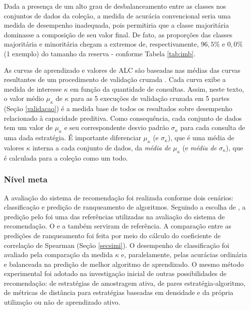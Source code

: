 Dada a presença de um alto grau de desbalanceamento entre as classes nos conjuntos de dados da coleção, a medida de acurácia convencional seria uma medida de desempenho inadequada, pois permitiria que a classe majoritária dominasse a composição de seu valor final.
De fato, as proporções das classes majoritária e minoritária chegam a extremos de, respectivamente, $96,5\%$ e $0,0\%$ (1 exemplo) do tamanho da reserva - conforme Tabela \ref{tab:imb}.

As curvas de aprendizado e valores de ALC são baseadas nas médias das curvas resultantes de um procedimento de validação cruzada \cite{settles2010active}.
Cada curva exibe a medida de interesse $\kappa$ em função da quantidade de consultas.
Assim, neste texto,  o valor médio $\mu_{\kappa}$ de $\kappa$ para as 5 execuções de validação cruzada em 5 partes (Seção \ref{validacao}) é a medida base de todos os resultados sobre desempenho relacionado à capacidade preditiva.
Como consequência, cada conjunto de dados tem um valor de $\mu_{\kappa}$ e seu correspondente desvio padrão $\sigma_{\kappa}$ para cada consulta de uma dada estratégia.
É importante diferenciar $\mu_{\kappa}$ (e $\sigma_{\kappa}$), que é uma média de valores $\kappa$ interna a cada conjunto de dados, da \textit{média de} $\mu_{\kappa}$ (e \textit{média de} $\sigma_{\kappa}$), que é calculada para a coleção como um todo.

\subsubsection{Nível meta}\label{avmeta}
A avaliação do sistema de recomendação foi realizada conforme dois cenários:
classificação 
e predição de ranqueamento de algoritmos.
Seguindo a escolha de , a predição pelo  foi uma das referências utilizadas na avaliação do sistema de recomendação.
O  e a  também serviram de referência.
A comparação entre as predições de ranqueamento foi feita por meio do cálculo do coeficiente de correlação de Spearman (Seção \ref{secsimi}).
O desempenho de classificação foi avaliado pela comparação da medida $\kappa$ e, paralelamente, pelas acurácias ordinária e balanceada na predição de melhor algoritmo de aprendizado.
O mesmo método experimental foi adotado na investigação inicial de outras possibilidades de recomendação: de estratégias de amostragem ativa, de pares estratégia-algoritmo, de métricas de distância para estratégias baseadas em densidade e da própria utilização ou não de aprendizado ativo.

